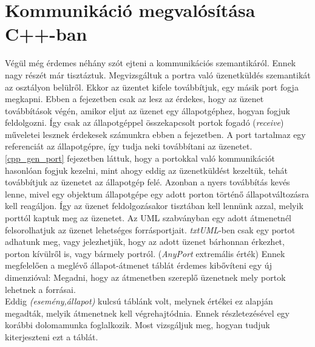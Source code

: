 \documentclass[a4paper,12pt]{report}
\begin{document}
\section{Kommunikáció megvalósítása C++-ban}
Végül még érdemes néhány szót ejteni a kommunikációs szemantikáról. Ennek nagy részét már tisztáztuk. Megvizsgáltuk a portra való üzenetküldés szemantikát az osztályon belülről. Ekkor az üzentet kifele továbbítjuk, egy másik port fogja megkapni. Ebben a fejezetben csak az lesz az érdekes, hogy az üzenet továbbítások végén, amikor eljut az üzenet egy állapotgéphez, hogyan fogjuk feldolgozni. Így csak az állapotgéppel összekapcsolt portok fogadó (\textit{receive}) műveletei lesznek érdekesek számunkra ebben a fejezetben. A port tartalmaz egy referenciát az állapotgépre, így tudja neki továbbítani az üzenetet. \ref{cpp_gen_port} fejezetben láttuk, hogy a portokkal való kommunikációt hasonlóan fogjuk kezelni, mint ahogy eddig az üzenetküldést kezeltük, tehát továbbítjuk az üzenetet az állapotgép felé. Azonban a nyers továbbítás kevés lenne, mivel egy objektum állapotgépe egy adott porton történő állapotváltozásra kell reagáljon. Így az üzenet feldolgozásakor tisztában kell lennünk azzal, melyik porttól kaptuk meg az üzenetet. Az UML szabványban egy adott átmenetnél felsorolhatjuk az üzenet lehetséges forrásportjait. \textit{txtUML}-ben csak egy portot adhatunk meg, vagy jelezhetjük, hogy az adott üzenet bárhonnan érkezhet, porton kívülről is, vagy bármely portról. (\textit{AnyPort} extremális érték) Ennek megfelelően a meglévő állapot-átmenet táblát érdemes kibővíteni egy új dimenzióval: Megadni, hogy az átmenetben szereplő üzenetnek mely portok lehetnek a forrásai. \\
Eddig \textit{(esemény,állapot)} kulcsú táblánk volt, melynek értékei ez alapján megadták, melyik átmenetnek kell végrehajtódnia. Ennek részletezésével egy korábbi dolomamunka foglalkozik\cite{hack_dip}. Most vizsgáljuk meg, hogyan tudjuk kiterjeszteni ezt a táblát.
\end{document}
